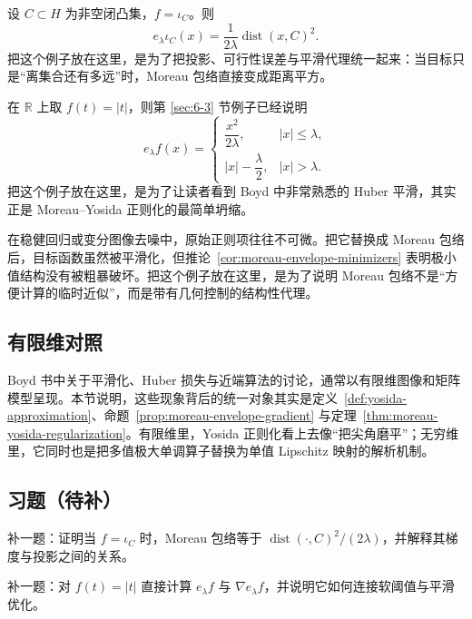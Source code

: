\begin{example}[指标函数的包络与距离平方]
设 $C\subset H$ 为非空闭凸集，$f=\iota_C$。则
\[
e_\lambda \iota_C(x)
=
\frac{1}{2\lambda}\operatorname{dist}(x,C)^2.
\]
把这个例子放在这里，是为了把投影、可行性误差与平滑代理统一起来：当目标只是“离集合还有多远”时，Moreau 包络直接变成距离平方。
\end{example}

\begin{example}
在 $\mathbb R$ 上取 $f(t)=|t|$，则第 \ref{sec:6-3} 节例子已经说明
\[
e_\lambda f(x)=
\begin{cases}
\dfrac{x^2}{2\lambda}, & |x|\le \lambda,\\[4pt]
|x|-\dfrac{\lambda}{2}, & |x|>\lambda.
\end{cases}
\]
把这个例子放在这里，是为了让读者看到 Boyd 中非常熟悉的 Huber 平滑，其实正是 Moreau--Yosida 正则化的最简单坍缩。
\end{example}

\begin{example}[稳健回归与图像去噪]
在稳健回归或变分图像去噪中，原始正则项往往不可微。把它替换成 Moreau 包络后，目标函数虽然被平滑化，但推论~\ref{cor:moreau-envelope-minimizers} 表明极小值结构没有被粗暴破坏。把这个例子放在这里，是为了说明 Moreau 包络不是“方便计算的临时近似”，而是带有几何控制的结构性代理。
\end{example}

\subsection*{有限维对照}

Boyd 书中关于平滑化、Huber 损失与近端算法的讨论，通常以有限维图像和矩阵模型呈现。本节说明，这些现象背后的统一对象其实是定义~\ref{def:yosida-approximation}、命题~\ref{prop:moreau-envelope-gradient} 与定理~\ref{thm:moreau-yosida-regularization}。有限维里，Yosida 正则化看上去像“把尖角磨平”；无穷维里，它同时也是把多值极大单调算子替换为单值 Lipschitz 映射的解析机制。

\subsection*{习题（待补）}

\begin{exercise}[距离平方占位]
补一题：证明当 $f=\iota_C$ 时，Moreau 包络等于 $\operatorname{dist}(\cdot,C)^2/(2\lambda)$，并解释其梯度与投影之间的关系。
\end{exercise}

\begin{exercise}
补一题：对 $f(t)=|t|$ 直接计算 $e_\lambda f$ 与 $\nabla e_\lambda f$，并说明它如何连接软阈值与平滑优化。
\end{exercise}
